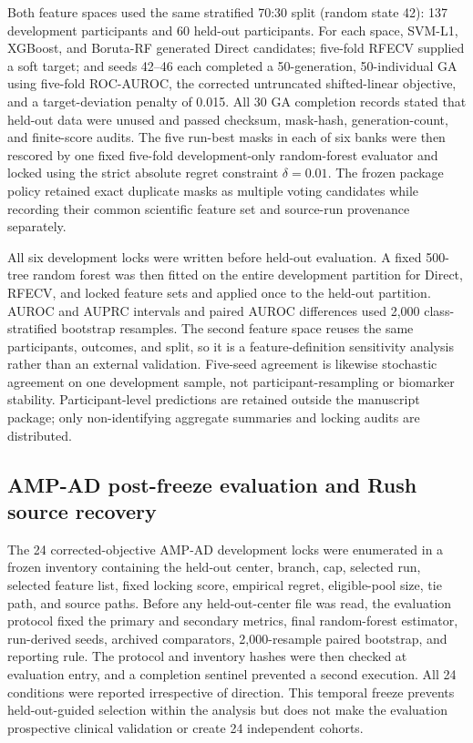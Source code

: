 Both feature spaces used the same stratified 70:30 split (random state 42): 137 development participants and 60 held-out participants. For each space, SVM-L1, XGBoost, and Boruta-RF generated Direct candidates; five-fold RFECV supplied a soft target; and seeds 42--46 each completed a 50-generation, 50-individual GA using five-fold ROC-AUROC, the corrected untruncated shifted-linear objective, and a target-deviation penalty of 0.015. All 30 GA completion records stated that held-out data were unused and passed checksum, mask-hash, generation-count, and finite-score audits. The five run-best masks in each of six banks were then rescored by one fixed five-fold development-only random-forest evaluator and locked using the strict absolute regret constraint $\delta=0.01$. The frozen package policy retained exact duplicate masks as multiple voting candidates while recording their common scientific feature set and source-run provenance separately.

All six development locks were written before held-out evaluation. A fixed 500-tree random forest was then fitted on the entire development partition for Direct, RFECV, and locked feature sets and applied once to the held-out partition. AUROC and AUPRC intervals and paired AUROC differences used 2,000 class-stratified bootstrap resamples. The second feature space reuses the same participants, outcomes, and split, so it is a feature-definition sensitivity analysis rather than an external validation. Five-seed agreement is likewise stochastic agreement on one development sample, not participant-resampling or biomarker stability. Participant-level predictions are retained outside the manuscript package; only non-identifying aggregate summaries and locking audits are distributed.

\subsection{AMP-AD post-freeze evaluation and Rush source recovery}

The 24 corrected-objective AMP-AD development locks were enumerated in a frozen inventory containing the held-out center, branch, cap, selected run, selected feature list, fixed locking score, empirical regret, eligible-pool size, tie path, and source paths. Before any held-out-center file was read, the evaluation protocol fixed the primary and secondary metrics, final random-forest estimator, run-derived seeds, archived comparators, 2,000-resample paired bootstrap, and reporting rule. The protocol and inventory hashes were then checked at evaluation entry, and a completion sentinel prevented a second execution. All 24 conditions were reported irrespective of direction.
This temporal freeze prevents held-out-guided selection within the analysis but does not make the evaluation prospective clinical validation or create 24 independent cohorts.

